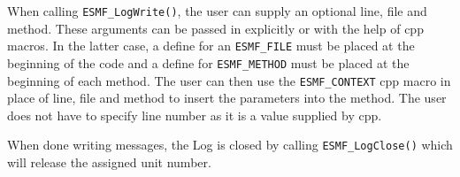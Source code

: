When calling {\tt ESMF\_LogWrite()}, the user can supply an optional line,
file and method.  These arguments can be passed in explicitly or with the help
of cpp macros.  In the latter case, a define for an {\tt ESMF\_FILE} must be 
placed at the beginning of the code and a define for {\tt ESMF\_METHOD} must
be placed at the beginning of each method.  The user can then use the
{\tt ESMF\_CONTEXT} cpp macro in place of line, file and method to insert the 
parameters into the method.  The user does not have to specify line number as
it is a value supplied by cpp.

When done writing messages, the Log is closed by calling 
{\tt ESMF\_LogClose()} which will release the assigned unit number.




